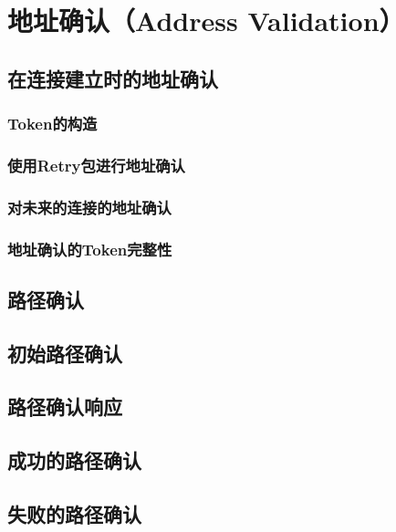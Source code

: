 \section{地址确认（Address Validation）}

\subsection{在连接建立时的地址确认}
\subsubsection{Token的构造}
\subsubsection{使用Retry包进行地址确认}
\subsubsection{对未来的连接的地址确认}
\subsubsection{地址确认的Token完整性}

\subsection{路径确认}
\subsection{初始路径确认}
\subsection{路径确认响应}
\subsection{成功的路径确认}
\subsection{失败的路径确认}
